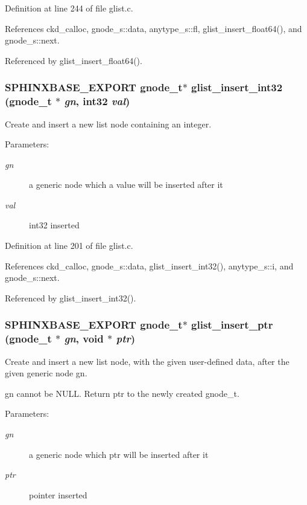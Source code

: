 Definition at line 244 of file glist.c.

References ckd\_\-calloc, gnode\_\-s::data, anytype\_\-s::fl, glist\_\-insert\_\-float64(), and gnode\_\-s::next.

Referenced by glist\_\-insert\_\-float64().
\subsubsection[{glist\_\-insert\_\-int32}]{\setlength{\rightskip}{0pt plus 5cm}SPHINXBASE\_\-EXPORT {\bf gnode\_\-t}$\ast$ glist\_\-insert\_\-int32 ({\bf gnode\_\-t} $\ast$ {\em gn}, \/  int32 {\em val})}\label{glist_8h_327b6478ee05ac17e3c3b3189579413e}


Create and insert a new list node containing an integer. 

\begin{Desc}
\item[Parameters: ]\par
\begin{description}
\item[{\em 
gn}]a generic node which a value will be inserted after it \item[{\em 
val}]int32 inserted \end{description}
\end{Desc}


Definition at line 201 of file glist.c.

References ckd\_\-calloc, gnode\_\-s::data, glist\_\-insert\_\-int32(), anytype\_\-s::i, and gnode\_\-s::next.

Referenced by glist\_\-insert\_\-int32().
\subsubsection[{glist\_\-insert\_\-ptr}]{\setlength{\rightskip}{0pt plus 5cm}SPHINXBASE\_\-EXPORT {\bf gnode\_\-t}$\ast$ glist\_\-insert\_\-ptr ({\bf gnode\_\-t} $\ast$ {\em gn}, \/  void $\ast$ {\em ptr})}\label{glist_8h_2d641da6b349c1c939e3b954382513ba}


Create and insert a new list node, with the given user-defined data, after the given generic node gn. 

gn cannot be NULL. Return ptr to the newly created gnode\_\-t. \begin{Desc}
\item[Parameters: ]\par
\begin{description}
\item[{\em 
gn}]a generic node which ptr will be inserted after it \item[{\em 
ptr}]pointer inserted \end{description}
\end{Desc}


